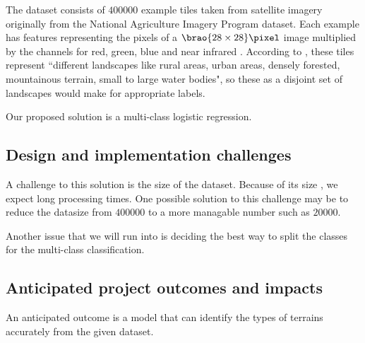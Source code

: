 \documentclass[11pt]{report}
\DeclarePairedDelimiter\brao()%
\begin{document}
The dataset consists of \(\num{400000}\) example tiles
taken from satellite imagery originally from the National Agriculture Imagery Program  dataset.
Each example has features representing the pixels of a \(\SI[parse-numbers=false]{\brao{28\times28}\!}\pixel\) image 
multiplied by the channels for red, green, blue and near infrared .
According to \textcite{Basu2015a},
these tiles represent ``different landscapes like rural areas, urban areas, densely forested, mountainous terrain, small to large water bodies",
so these as a disjoint set of landscapes would make for appropriate labels.

Our proposed solution is a multi-class logistic regression.

\subsection{Design and implementation challenges}

A challenge to this solution is the size of the dataset.
Because of its size , we expect long processing times.
One possible solution to this challenge may be to reduce the datasize
from \(\num{400000}\) to a more managable number such as
\(\num{20000}\).

Another issue that we will run into is deciding the best way to split the classes for the multi-class classification.

\subsection{Anticipated project outcomes and impacts}

An anticipated outcome is a model that can identify the types of terrains accurately from the given dataset.
\end{document}
